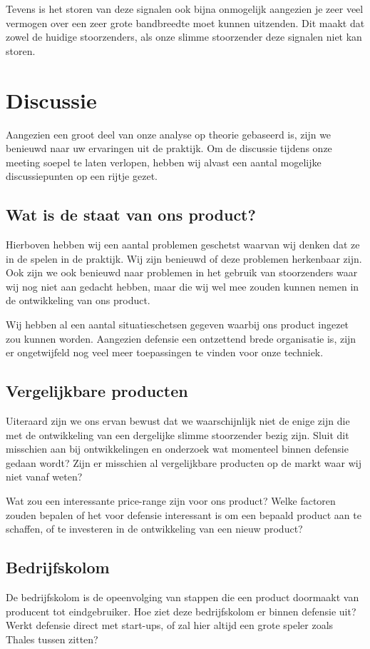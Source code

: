 \documentclass[oneside, a4paper, openany]{memoir}
\begin{document}
Tevens is het storen van deze signalen ook bijna onmogelijk aangezien je zeer veel vermogen over een zeer grote bandbreedte moet kunnen uitzenden. Dit maakt dat zowel de huidige stoorzenders, als onze slimme stoorzender deze signalen niet kan storen.

\chapter{Discussie}
Aangezien een groot deel van onze analyse op theorie gebaseerd is, zijn we benieuwd naar uw ervaringen uit de praktijk. Om de discussie tijdens onze meeting soepel te laten verlopen, hebben wij alvast een aantal mogelijke discussiepunten op een rijtje gezet.

\section{Wat is de staat van ons product?}
Hierboven hebben wij een aantal problemen geschetst waarvan wij denken dat ze in de spelen in de praktijk. Wij zijn benieuwd of deze problemen herkenbaar zijn. Ook zijn we ook benieuwd naar problemen in het gebruik van stoorzenders waar wij nog niet aan gedacht hebben, maar die wij wel mee zouden kunnen nemen in de ontwikkeling van ons product.

Wij hebben al een aantal situatieschetsen gegeven waarbij ons product ingezet zou kunnen worden. Aangezien defensie een ontzettend brede organisatie is, zijn er ongetwijfeld nog veel meer toepassingen te vinden voor onze techniek.

\section{Vergelijkbare producten}
Uiteraard zijn we ons ervan bewust dat we waarschijnlijk niet de enige zijn die met de ontwikkeling van een dergelijke slimme stoorzender bezig zijn. Sluit dit misschien aan bij ontwikkelingen en onderzoek wat momenteel binnen defensie gedaan wordt? Zijn er misschien al vergelijkbare producten op de markt waar wij niet vanaf weten?

Wat zou een interessante price-range zijn voor ons product? Welke factoren zouden bepalen of het voor defensie interessant is om een bepaald product aan te schaffen, of te investeren in de ontwikkeling van een nieuw product?

\section{Bedrijfskolom}
De bedrijfskolom is de opeenvolging van stappen die een product doormaakt van producent tot eindgebruiker. Hoe ziet deze bedrijfskolom er binnen defensie uit? Werkt defensie direct met start-ups, of zal hier altijd een grote speler zoals  Thales tussen zitten?
\end{document}
